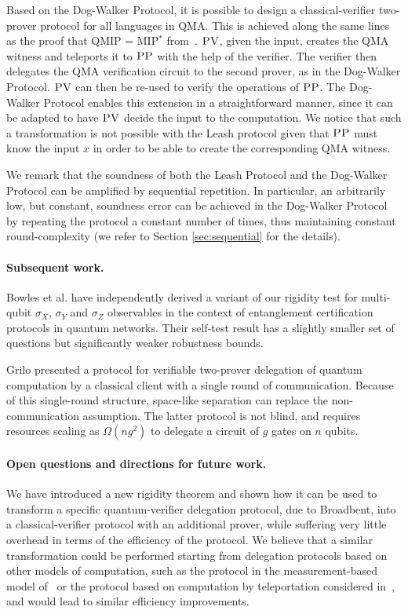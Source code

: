 Based on the Dog-Walker Protocol, it is possible to design a classical-verifier  two-prover protocol for all languages in QMA. This is achieved along the same lines as the proof that QMIP = MIP$^*$ from~\cite{reichardt2012classical}. $\textsc{PV}$, given the input, creates the QMA witness and teleports it to $\textsc{PP}$ with the help of the verifier. The verifier then delegates the QMA verification circuit to the second prover, as in the Dog-Walker Protocol. $\textsc{PV}$ can then be re-used to verify the operations of $\textsc{PP}$. The Dog-Walker Protocol enables this extension in a straightforward manner, since it can be adapted to have $\textsc{PV}$ decide the input to the computation. We notice that such a transformation is not possible with the Leash protocol given that $\textsc{PP}$ must know the input $x$ in order to be able to create the corresponding QMA witness.

We remark that the soundness of both the Leash Protocol and the Dog-Walker Protocol can be amplified by sequential repetition. In particular, an arbitrarily low, but constant, soundness error can be achieved in the Dog-Walker Protocol by repeating the protocol a constant number of times, thus maintaining constant round-complexity (we refer to Section \ref{sec:sequential} for the details).

\paragraph{Subsequent work.}
Bowles et al. \cite{BowlesSCA18}  have independently derived a
variant of our rigidity test for multi-qubit $\sigma_X$, $\sigma_Y$ and $\sigma_Z$ observables
in the context of entanglement certification protocols in
quantum networks.
Their self-test result has a slightly smaller set of questions but  significantly weaker robustness
bounds.

Grilo \cite{Grilo17} presented a protocol for verifiable
two-prover delegation of quantum computation by a classical client with a single round of communication. Because of this single-round structure, space-like separation can replace the non-communication assumption. The latter protocol is not blind, and requires resources scaling as $\Omega(ng^2)$ to delegate a circuit of $g$ gates on $n$ qubits.

\paragraph{Open questions and directions for future work.}
We have introduced a new rigidity theorem and shown how it can be used to transform a specific quantum-verifier delegation protocol, due to Broadbent, into a classical-verifier protocol with an additional prover, while suffering very little overhead in terms of the efficiency of the protocol. We believe that a similar transformation could be performed starting from delegation protocols based on other models of computation, such as the protocol in the measurement-based model of~\cite{fitzsimons12vubqc} or the protocol based on computation by teleportation considered in~\cite{reichardt2012classical}, and would lead to similar efficiency improvements. 

